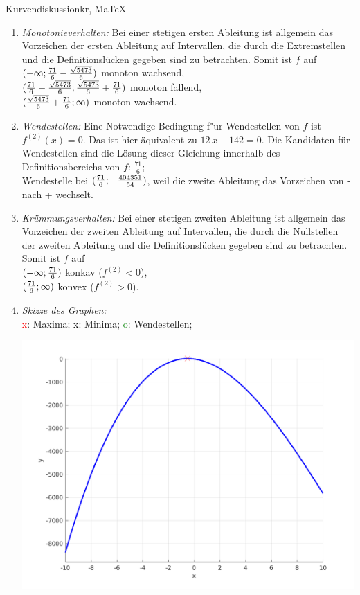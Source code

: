 \begin{MAufgabe}{Kurvendiskussion}{kr, MaTeX}
\begin{enumerate}
 \item \emph{Monotonieverhalten:} 
 Bei einer stetigen ersten Ableitung ist allgemein das Vorzeichen der ersten Ableitung auf Intervallen, die durch die Extremstellen und die Definitionsl\"ucken gegeben sind zu betrachten. Somit ist $f$ auf \\ 
 $(-\infty;\frac{71}{6} - \frac{\sqrt{5473}}{6})$ monoton wachsend, \\ 
 $(\frac{71}{6} - \frac{\sqrt{5473}}{6};\frac{\sqrt{5473}}{6} + \frac{71}{6})$ monoton  fallend, \\ 
 $(\frac{\sqrt{5473}}{6} + \frac{71}{6}; \infty)$ monoton wachsend. \\ 
 \item \emph{Wendestellen:} 
 Eine Notwendige Bedingung f"ur Wendestellen von $f$ ist $f^{(2)}(x)=0$. 
 Das ist hier \"aquivalent zu $12\, x - 142=0$. 
 Die Kandidaten f\"ur Wendestellen sind die L\"osung dieser Gleichung innerhalb des Definitionsbereichs von $f$: $\frac{71}{6}$; \\ 
 Wendestelle bei $(\frac{71}{6};- \frac{404351}{54})$, weil die zweite Ableitung das Vorzeichen von - nach + wechselt. \\ 
 \item \emph{Kr\"ummungsverhalten:} 
 Bei einer stetigen zweiten Ableitung ist allgemein das Vorzeichen der zweiten Ableitung auf Intervallen, die durch die Nullstellen der zweiten Ableitung und die Definitionsl\"ucken gegeben sind zu betrachten. 
 Somit ist $f$ auf \\ 
 $(-\infty ;\frac{71}{6})$  konkav ($f^{(2)}<0$), \\ 
 $(\frac{71}{6}; \infty)$  konvex ($f^{(2)}>0$). \\ 
 \item \emph{Skizze des Graphen:} \\ 
 {\textcolor{red} x}: Maxima; {\textcolor{black} x}: Minima; {\textcolor{green} o}: Wendestellen; 
  \begin{center}
  \includegraphics[width=0.8\linewidth]{Abb_zur_Ag_autogenerated_fractions_24.png} \end{center}
  
 \end{enumerate}
 \else\relax\fi
  \end{MAufgabe}